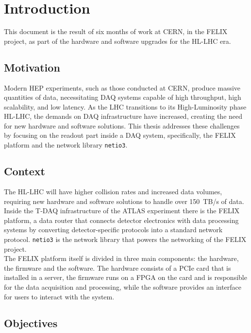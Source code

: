 \chapter{Introduction}

This document is the result of six months of work at \acs{CERN}, in the \acs{FELIX} project, as part of the hardware and software upgrades for the \acl{HL-LHC} era.

\section{Motivation}

Modern \acl{HEP} experiments, such as those conducted at \acf{CERN}, produce massive quantities of data, necessitating \acf{DAQ} systems capable of high throughput, high scalability, and low latency. As the \acf{LHC} transitions to its High-Luminosity phase \acs{HL-LHC}, the demands on \acs{DAQ} infrastructure have increased, creating the need for new hardware and software solutions. This thesis addresses these challenges by focusing on the readout part inside a \acl{DAQ} system, specifically, the \acs{FELIX} platform and the network library \texttt{netio3}.

\section{Context}

The \acs{HL-LHC} will have higher collision rates and increased data volumes, requiring new hardware and software solutions to handle over 150~TB/s of data. Inside the \acl{T-DAQ} infrastructure of the \acs{ATLAS} experiment there is the \acs{FELIX} platform, a data router that connects detector electronics with data processing systems by converting detector-specific protocols into a standard network protocol.
\texttt{netio3} is the network library that powers the networking of the \acs{FELIX} project.\\
The \acs{FELIX} platform itself is divided in three main components: the hardware, the firmware and the software. The hardware consists of a \acs{PCIe} card that is installed in a server, the firmware runs on a \acs{FPGA} on the card and is responsible for the data acquisition and processing, while the software provides an interface for users to interact with the system.

\section{Objectives}

